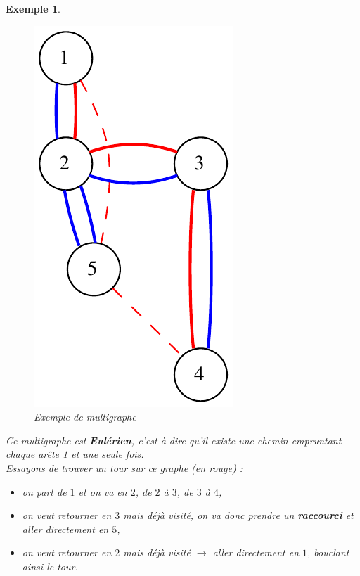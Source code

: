 \documentclass{article}
\newtheorem{exemple}{Exemple}[section]
\begin{document}
\begin{sffamily}
\begin{exemple}$ $\\
\begin{figure}[h!]
    \begin{center}
    \includegraphics[scale=0.45]{multig.pdf}
    \caption{Exemple de multigraphe}
    \end{center}
\end{figure}

\noindent Ce multigraphe est \textbf{Eulérien}, c'est-à-dire qu'il existe une chemin empruntant chaque arête 1 et une seule fois.\\
Essayons de trouver un tour sur ce graphe (en rouge) :
\begin{itemize}
\item on part de $1$ et on va en $2$, de $2$ à $3$, de $3$ à $4$,
\item on veut retourner en $3$ mais déjà visité, on va donc prendre un \textbf{raccourci} et aller directement en $5$,
\item on veut retourner en $2$ mais déjà visité $\rightarrow$ aller directement en $1$, bouclant ainsi le tour.
\end{itemize}
\end{exemple}


\end{sffamily}
\end{document}
